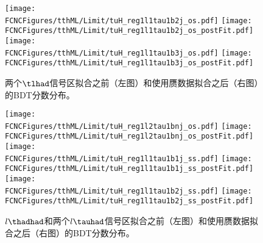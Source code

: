\begin{figure}[H]
\centering
\texttt{[image: \\FCNCFigures/tthML/Limit/tuH\_reg1l1tau1b2j\_os.pdf]}
\texttt{[image: \\FCNCFigures/tthML/Limit/tuH\_reg1l1tau1b2j\_os\_postFit.pdf]}\\
\texttt{[image: \\FCNCFigures/tthML/Limit/tuH\_reg1l1tau1b3j\_os.pdf]}
\texttt{[image: \\FCNCFigures/tthML/Limit/tuH\_reg1l1tau1b3j\_os\_postFit.pdf]}\\

\caption{ 两个$\tlhad$信号区拟合之前（左图）和使用赝数据拟合之后（右图）的BDT分数分布。}
\label{fig:tthML_trexPrefit}
\end{figure}

\begin{figure}[H]
\centering
\texttt{[image: \\FCNCFigures/tthML/Limit/tuH\_reg1l2tau1bnj\_os.pdf]}
\texttt{[image: \\FCNCFigures/tthML/Limit/tuH\_reg1l2tau1bnj\_os\_postFit.pdf]}\\
\texttt{[image: \\FCNCFigures/tthML/Limit/tuH\_reg1l1tau1b1j\_ss.pdf]}
\texttt{[image: \\FCNCFigures/tthML/Limit/tuH\_reg1l1tau1b1j\_ss\_postFit.pdf]}\\
\texttt{[image: \\FCNCFigures/tthML/Limit/tuH\_reg1l1tau1b2j\_ss.pdf]}
\texttt{[image: \\FCNCFigures/tthML/Limit/tuH\_reg1l1tau1b2j\_ss\_postFit.pdf]}\\

\caption{ $l\thadhad$和两个$l\tauhad$信号区拟合之前（左图）和使用赝数据拟合之后（右图）的BDT分数分布。}
\label{fig:tthML_trexPrefit_1}
\end{figure}
